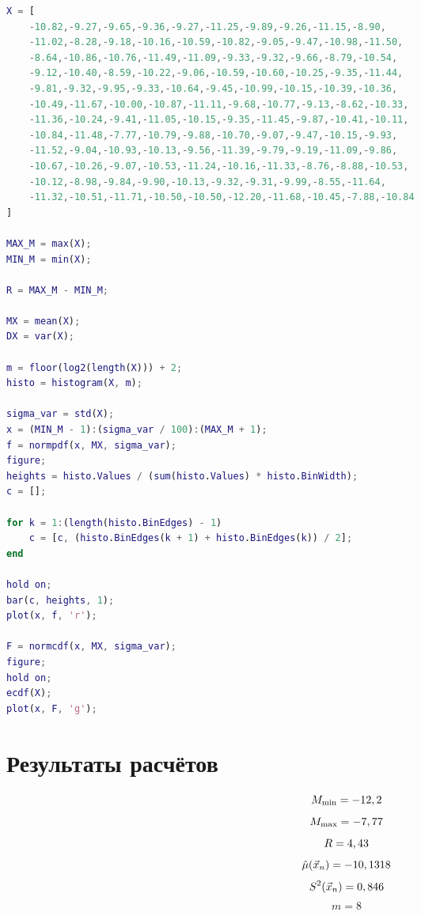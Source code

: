 \documentclass[12pt]{report}
\begin{document}
\begin{lstlisting}[language=Matlab]
X = [
	-10.82,-9.27,-9.65,-9.36,-9.27,-11.25,-9.89,-9.26,-11.15,-8.90,
	-11.02,-8.28,-9.18,-10.16,-10.59,-10.82,-9.05,-9.47,-10.98,-11.50,
	-8.64,-10.86,-10.76,-11.49,-11.09,-9.33,-9.32,-9.66,-8.79,-10.54,
	-9.12,-10.40,-8.59,-10.22,-9.06,-10.59,-10.60,-10.25,-9.35,-11.44,
	-9.81,-9.32,-9.95,-9.33,-10.64,-9.45,-10.99,-10.15,-10.39,-10.36,
	-10.49,-11.67,-10.00,-10.87,-11.11,-9.68,-10.77,-9.13,-8.62,-10.33,
	-11.36,-10.24,-9.41,-11.05,-10.15,-9.35,-11.45,-9.87,-10.41,-10.11,
	-10.84,-11.48,-7.77,-10.79,-9.88,-10.70,-9.07,-9.47,-10.15,-9.93,
	-11.52,-9.04,-10.93,-10.13,-9.56,-11.39,-9.79,-9.19,-11.09,-9.86,
	-10.67,-10.26,-9.07,-10.53,-11.24,-10.16,-11.33,-8.76,-8.88,-10.53,
	-10.12,-8.98,-9.84,-9.90,-10.13,-9.32,-9.31,-9.99,-8.55,-11.64,
	-11.32,-10.51,-11.71,-10.50,-10.50,-12.20,-11.68,-10.45,-7.88,-10.84
]

MAX_M = max(X);
MIN_M = min(X);

R = MAX_M - MIN_M;

MX = mean(X);
DX = var(X);

m = floor(log2(length(X))) + 2;
histo = histogram(X, m);

sigma_var = std(X);
x = (MIN_M - 1):(sigma_var / 100):(MAX_M + 1);
f = normpdf(x, MX, sigma_var);
figure;
heights = histo.Values / (sum(histo.Values) * histo.BinWidth);
c = [];

for k = 1:(length(histo.BinEdges) - 1)
	c = [c, (histo.BinEdges(k + 1) + histo.BinEdges(k)) / 2];
end

hold on;
bar(c, heights, 1); 
plot(x, f, 'r');

F = normcdf(x, MX, sigma_var); 
figure;
hold on;
ecdf(X); 
plot(x, F, 'g');
\end{lstlisting}

\section*{Результаты расчётов}

\begin{equation*}
M_{\min} = -12,2 \\
\end{equation*}
\begin{equation*}
M_{\max} = -7,77 \\
\end{equation*}
\begin{equation*}
R = 4,43 \\
\end{equation*}
\begin{equation*}
\hat\mu(\vec x_n) = -10,1318 \\
\end{equation*}
\begin{equation*}
S^2(\vec x_n) = 0,846 \\
\end{equation*}
\begin{equation*}
m = 8
\end{equation*}
\end{document}
